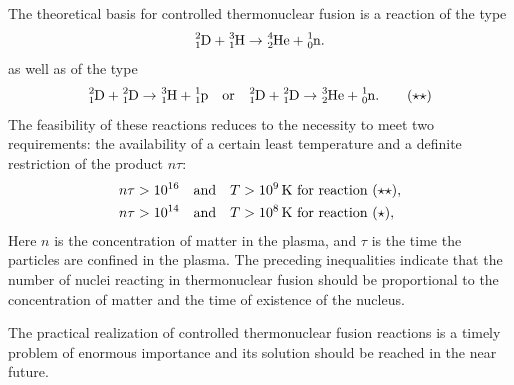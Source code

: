 The theoretical basis for controlled thermonuclear fusion is a reaction of the type
\begin{equation*}%
\ce{^{2}_{1}D}  + \ce{^{3}_{1}H}  \to \ce{^{4}_{2}He} +  \ce{^{1}_{0}n}. 
\end{equation*}
as well as of the type
\begin{equation*}%
\ce{^{2}_{1}D} + \ce{^{2}_{1}D}   \to  \ce{^{3}_{1}H} + \ce{^{1}_{1}p} \qor \ce{^{2}_{1}D} + \ce{^{2}_{1}D}   \to  \ce{^{3}_{2}He} + \ce{^{1}_{0}n}. \tag{$\star \star$}
\end{equation*}
The feasibility of these reactions reduces to the necessity to meet two requirements: the availability of a certain least temperature and a definite restriction of the product $n \tau$:
\begin{align*}%
n \tau & > \num{d16} \qand T > \SI{d9}{\kelvin} \text{ for reaction } (\star \star),\\
n \tau & > \num{d14} \qand T > \SI{d8}{\kelvin} \text{ for reaction } (\star),
\end{align*}
Here $n$ is the concentration of matter in the plasma, and $\tau$ is the time the particles are confined in the plasma. The preceding inequalities indicate that the number of nuclei reacting in thermonuclear fusion should be proportional to the concentration of matter and the time of existence of the nucleus.

The practical realization of controlled thermonuclear fusion
reactions is a timely problem of enormous importance and its
solution should be reached in the near future.
